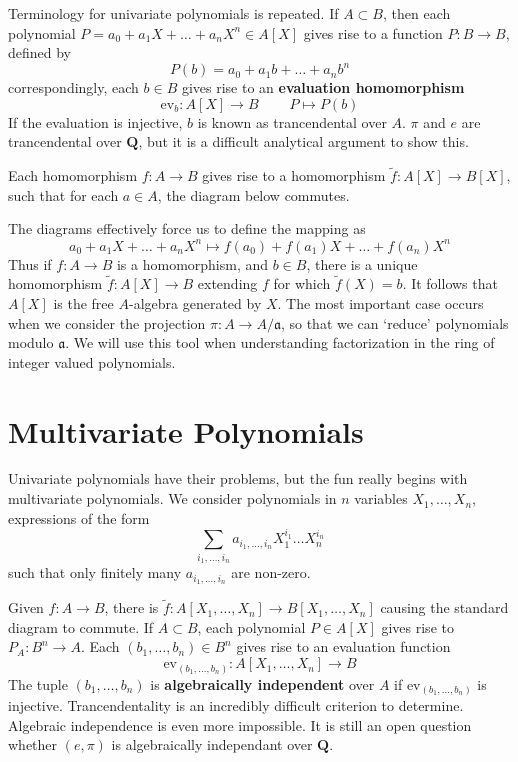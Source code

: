 Terminology for univariate polynomials is repeated. If $A \subset B$, then each polynomial $P = a_0 + a_1 X + \dots + a_n X^n \in A[X]$ gives rise to a function $P: B \to B$, defined by
%
\[ P(b) = a_0 + a_1 b + \dots + a_n b^n \]
%
correspondingly, each $b \in B$ gives rise to an {\bf evaluation homomorphism}
%
\[ \text{ev}_b: A[X] \to B\ \ \ \ \ \ \ \ \ \ P \mapsto P(b) \]
%
If the evaluation is injective, $b$ is known as trancendental over $A$. $\pi$ and $e$ are trancendental over $\mathbf{Q}$, but it is a difficult analytical argument to show this.

Each homomorphism $f: A \to B$ gives rise to a homomorphism $\tilde{f}: A[X] \to B[X]$, such that for each $a \in A$, the diagram below commutes.
%
\begin{center}
\end{center}
%
The diagrams effectively force us to define the mapping as
%
\[ a_0 + a_1 X + \dots + a_n X^n \mapsto f(a_0) + f(a_1) X + \dots + f(a_n) X^n \]
%
Thus if $f:A \to B$ is a homomorphism, and $b \in B$, there is a unique homomorphism $\tilde{f}: A[X] \to B$ extending $f$ for which $\tilde{f}(X) = b$. It follows that $A[X]$ is the free $A$-algebra generated by $X$. The most important case occurs when we consider the projection $\pi : A \to A/\mathfrak{a}$, so that we can `reduce' polynomials modulo $\mathfrak{a}$. We will use this tool when understanding factorization in the ring of integer valued polynomials.




\section{Multivariate Polynomials}

Univariate polynomials have their problems, but the fun really begins with multivariate polynomials. We consider polynomials in $n$ variables $X_1, \dots, X_n$, expressions of the form
%
\[ \sum_{i_1, \dots, i_n} a_{i_1, \dots, i_n} X_1^{i_1} \dots X_n^{i_n} \]
%
such that only finitely many $a_{i_1, \dots, i_n}$ are non-zero.

Given $f: A \to B$, there is $\tilde{f}: A[X_1, \dots, X_n] \to B[X_1, \dots, X_n]$ causing the standard diagram to commute. If $A \subset B$, each polynomial $P \in A[X]$ gives rise to $P_A: B^n \to A$. Each $(b_1, \dots, b_n) \in B^n$ gives rise to an evaluation function
%
\[ \text{ev}_{(b_1, \dots, b_n)}: A[X_1, \dots, X_n] \to B \]
%
The tuple $(b_1, \dots, b_n)$ is {\bf algebraically independent} over $A$ if $\text{ev}_{(b_1, \dots, b_n)}$ is injective. Trancendentality is an incredibly difficult criterion to determine. Algebraic independence is even more impossible. It is still an open question whether $(e, \pi)$ is algebraically independant over $\mathbf{Q}$.

